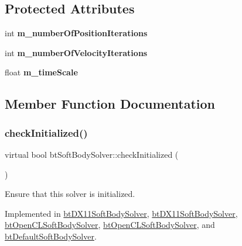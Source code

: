 \subsection*{Protected Attributes}
\begin{DoxyCompactItemize}
\item 
\mbox{\label{classbtSoftBodySolver_aa1f0693cdd4eee6acae68f913ac22d1e}} 
int {\bfseries m\+\_\+number\+Of\+Position\+Iterations}
\item 
\mbox{\label{classbtSoftBodySolver_aae88ccedc8f0c3e17086664ddd565ca6}} 
int {\bfseries m\+\_\+number\+Of\+Velocity\+Iterations}
\item 
\mbox{\label{classbtSoftBodySolver_a2f1b029913dc8873312d6107b768b67a}} 
float {\bfseries m\+\_\+time\+Scale}
\end{DoxyCompactItemize}


\subsection{Member Function Documentation}
\mbox{\label{classbtSoftBodySolver_aae0adf7ffc11cd7fafec927a54c654d5}} 
\subsubsection{\texorpdfstring{check\+Initialized()}{checkInitialized()}}
{\footnotesize\ttfamily virtual bool bt\+Soft\+Body\+Solver\+::check\+Initialized (\begin{DoxyParamCaption}{ }\end{DoxyParamCaption})\hspace{0.3cm}{\ttfamily [pure virtual]}}

Ensure that this solver is initialized. 

Implemented in \hyperlink{classbtDX11SoftBodySolver_a22b92962365db3adc0086eaac84dde9f}{bt\+D\+X11\+Soft\+Body\+Solver}, \hyperlink{classbtDX11SoftBodySolver_aeb15cea9089da79d1eb40f3786ec86a0}{bt\+D\+X11\+Soft\+Body\+Solver}, \hyperlink{classbtOpenCLSoftBodySolver_a7cafc88f5845c099ce33fb6c5b84968e}{bt\+Open\+C\+L\+Soft\+Body\+Solver}, \hyperlink{classbtOpenCLSoftBodySolver_a246093f49e31b6c17fad98c7ac878860}{bt\+Open\+C\+L\+Soft\+Body\+Solver}, and \hyperlink{classbtDefaultSoftBodySolver_afa91458c5c1bf45d11bd0cc2b5a8fc71}{bt\+Default\+Soft\+Body\+Solver}.

